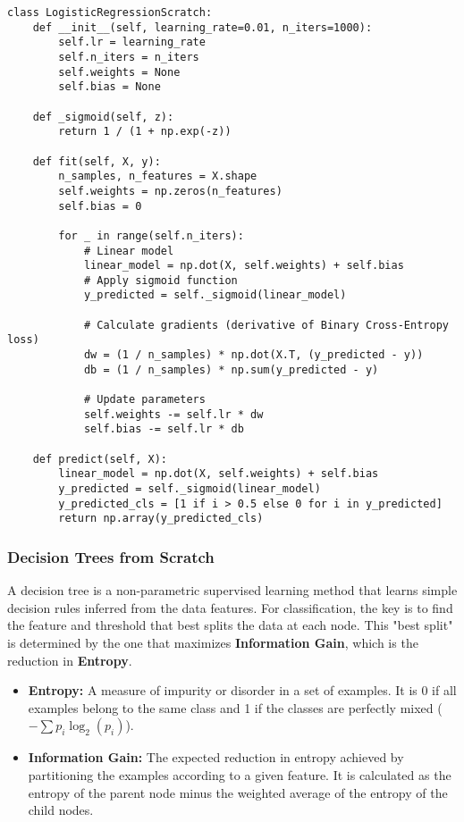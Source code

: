 \documentclass[11pt,a4paper]{article}
\begin{document}
\begin{lstlisting}
class LogisticRegressionScratch:
    def __init__(self, learning_rate=0.01, n_iters=1000):
        self.lr = learning_rate
        self.n_iters = n_iters
        self.weights = None
        self.bias = None

    def _sigmoid(self, z):
        return 1 / (1 + np.exp(-z))

    def fit(self, X, y):
        n_samples, n_features = X.shape
        self.weights = np.zeros(n_features)
        self.bias = 0

        for _ in range(self.n_iters):
            # Linear model
            linear_model = np.dot(X, self.weights) + self.bias
            # Apply sigmoid function
            y_predicted = self._sigmoid(linear_model)

            # Calculate gradients (derivative of Binary Cross-Entropy loss)
            dw = (1 / n_samples) * np.dot(X.T, (y_predicted - y))
            db = (1 / n_samples) * np.sum(y_predicted - y)

            # Update parameters
            self.weights -= self.lr * dw
            self.bias -= self.lr * db

    def predict(self, X):
        linear_model = np.dot(X, self.weights) + self.bias
        y_predicted = self._sigmoid(linear_model)
        y_predicted_cls = [1 if i > 0.5 else 0 for i in y_predicted]
        return np.array(y_predicted_cls)
\end{lstlisting}

\subsubsection{Decision Trees from Scratch}

A decision tree is a non-parametric supervised learning method that learns simple decision rules inferred from the data features. For classification, the key is to find the feature and threshold that best splits the data at each node. This "best split" is determined by the one that maximizes \textbf{Information Gain}, which is the reduction in \textbf{Entropy}.

\begin{itemize}
    \item \textbf{Entropy:} A measure of impurity or disorder in a set of examples. It is 0 if all examples belong to the same class and 1 if the classes are perfectly mixed ($-\sum p_i \log_2(p_i)$).
    \item \textbf{Information Gain:} The expected reduction in entropy achieved by partitioning the examples according to a given feature. It is calculated as the entropy of the parent node minus the weighted average of the entropy of the child nodes.
\end{itemize}
\end{document}
